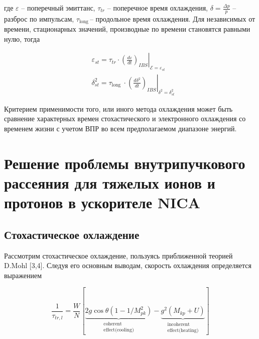 \noindent где $\varepsilon$ – поперечный эмиттанс, $\tau_{tr}$ – поперечное время охлаждения, $\delta=\frac{\Delta p}{p}$ – разброс по импульсам, $\tau_{\mathrm{long\ }}$– продольное время охлаждения.
Для независимых от времени, стационарных значений, производные по времени становятся равными нулю, тогда

\begin{equation}
\begin{aligned}
& \varepsilon_{s t}=\left.\tau_{t r} \cdot\left(\frac{d \varepsilon}{d t}\right)_{I B S}\right|_{\mathcal{E}=\varepsilon_{s t}} \\
& \delta_{s t}^2=\left.\tau_{\text {long }} \cdot\left(\frac{d \delta^2}{d t}\right)_{I B S}\right|_{\delta^2=\delta_{s t}^2}
\end{aligned}
\end{equation}

Критерием применимости того, или иного метода охлаждения может быть сравнение характерных времен стохастического и электронного охлаждения со временем жизни с учетом ВПР во всем предполагаемом диапазоне энергий.

	\section{Решение проблемы внутрипучкового рассеяния для тяжелых ионов и протонов в ускорителе NICA }\label{sec:ions_light/IBS}
	
		\subsection{Стохастическое охлаждение}

\par Рассмотрим стохастическое охлаждение, пользуясь приближенной теорией D.Mohl [3,4]. Следуя его основным выводам, скорость охлаждения определяется выражением		
	
\begin{equation}
\frac{1}{\tau_{t r, l}}=\frac{W}{N}[\underbrace{2 g \cos \theta\left(1-1 / M_{p k}^2\right)}_{\begin{array}{c}
\text { coherent } \\
\text { effect(cooling) }
\end{array}}-\underbrace{g^2\left(M_{k p}+U\right)}_{\begin{array}{c}
\text { incoherent } \\
\text { effect(heating) }
\end{array}}]
\end{equation}	

